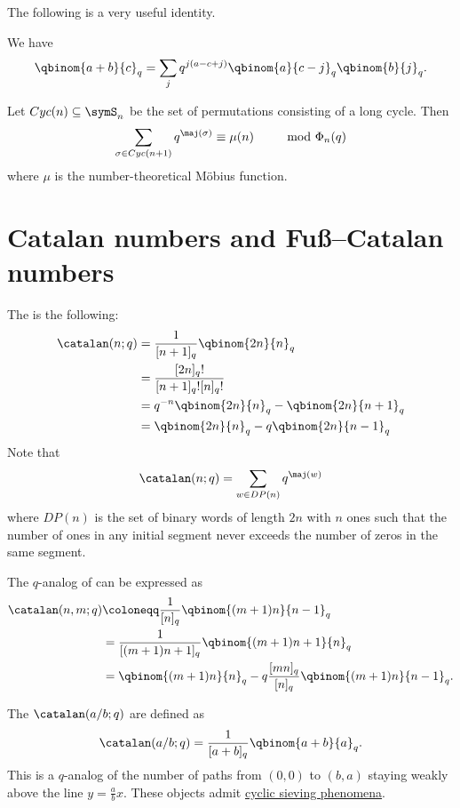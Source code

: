 The following is a very useful identity.
\begin{theorem}[$q$-Vandermonde]
We have
\[
\qbinom{a+b}{c}_q  =  \sum_{j} q^{j(a-c+j)} \qbinom{a}{c-j}_q \qbinom{b}{j}_q.
\]
\end{theorem}


\begin{theorem}
Let $Cyc(n) \subseteq \symS_n$ be the set of permutations consisting of a long cycle.
Then
\[
\sum_{\sigma \in Cyc(n+1)} q^{\maj(\sigma)} \equiv \mu(n) \qquad \mod \Phi_n(q)
\]
where $\mu$ is the number-theoretical Möbius function.
\end{theorem}






\section[prelimQanalogsCatalan]{Catalan numbers and Fuß--Catalan numbers}

The
\label{macMahonQCatalan}
is the following:
\begin{align*}
\catalan(n;q) &= \frac{1}{[n+1]_q}\qbinom{2n}{n}_q \\
			  &= \frac{[2n]_q!}{[n+1]_q![n]_q! } \\
              &= q^{-n} \qbinom{2n}{n}_q - \qbinom{2n}{n+1}_q \\
              &= \qbinom{2n}{n}_q - q \qbinom{2n}{n-1}_q
\end{align*}
Note that
\[
\catalan(n;q) = \sum_{w \in DP(n)} q^{\maj(w)}
\]
where $DP(n)$ is the set of binary words of length $2n$ with $n$ ones such
that the number of ones in any initial segment never exceeds the number of
zeros in the same segment.


The $q$-analog of \label{qFussCatalan}
can be expressed as
\begin{align*}
\catalan(n,m;q) &\coloneqq \frac{1}{[n]_q} \qbinom{(m+1)n}{n-1}_q \\
&=  \frac{1}{[(m+1)n+1]_q}\qbinom{(m+1)n+1}{n}_q \\
&= \qbinom{(m+1)n}{n}_q - q \frac{[mn]_q}{[n]_q} \qbinom{(m+1)n}{n-1}_q.
\end{align*}


The \label{rationalQCatalanNumber}
$\catalan(a/b;q)$ are defined as
\[
\catalan(a/b;q)= \frac{1}{[a+b]_q} \qbinom{a+b}{a}_q.
\]
This is a $q$-analog of the number of paths from $(0,0)$ to $(b,a)$
staying weakly above the line $y=\frac{a}{b}x$.
These objects admit \hyperref[cspRationalCatalan]{cyclic sieving phenomena}.



